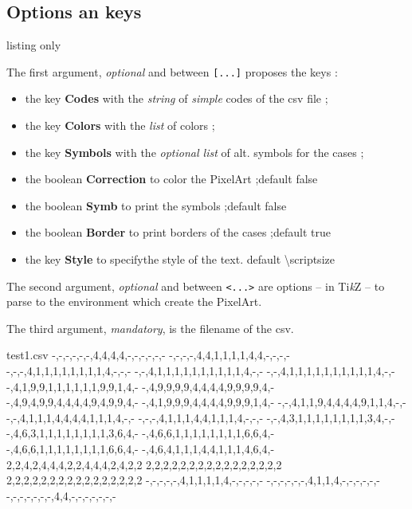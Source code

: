 \documentclass{article}
\newcommand\Cle[1]{{\bfseries\sffamily\textlangle #1\textrangle}}
\begin{document}
\pagebreak

\subsection{Options an keys}

\begin{PresentationCode}{listing only}
\end{PresentationCode}

The first argument, \textit{optional} and between \texttt{[...]} proposes the \textsf{keys} :

\begin{itemize}
	\item the key \Cle{Codes} with the \textit{string} of \textit{simple} codes of the \textsf{csv} file ;
	\item the key \Cle{Colors} with the \textit{list} of colors ;
	\item the key \Cle{Symbols} with the \textit{optional list} of alt. symbols for the cases ;
	\item the boolean \Cle{Correction} to color the PixelArt ;\hfill{}default \textsf{false}
	\item the boolean \Cle{Symb} to print the symbols ;\hfill{}default \textsf{false}
	\item the boolean \Cle{Border} to print borders of the cases ;\hfill{}default \textsf{true}
	\item the key \Cle{Style} to specifythe style of the text. \hfill{}default \textsf{\textbackslash scriptsize}
\end{itemize}

The second argument, \textit{optional} and between \texttt{<...>} are options -- in  Ti\textit{k}Z -- to parse to the environment which create the PixelArt.

\medskip

The third argument, \textit{mandatory}, is the filename of the \textsf{csv}.


\begin{PresentationCode}{}
\begin{filecontents*}[overwrite]{test1.csv}
	-,-,-,-,-,-,4,4,4,4,-,-,-,-,-,-
	-,-,-,-,4,4,1,1,1,1,4,4,-,-,-,-
	-,-,-,4,1,1,1,1,1,1,1,1,4,-,-,-
	-,-,4,1,1,1,1,1,1,1,1,1,1,4,-,-
	-,-,4,1,1,1,1,1,1,1,1,1,1,4,-,-
	-,4,1,9,9,1,1,1,1,1,1,9,9,1,4,-
	-,4,9,9,9,9,4,4,4,4,9,9,9,9,4,-
	-,4,9,4,9,9,4,4,4,4,9,4,9,9,4,-
	-,4,1,9,9,9,4,4,4,4,9,9,9,1,4,-
	-,-,4,1,1,9,4,4,4,4,9,1,1,4,-,-
	-,-,4,1,1,1,4,4,4,4,1,1,1,4,-,-
	-,-,-,4,1,1,1,4,4,1,1,1,4,-,-,-
	-,-,4,3,1,1,1,1,1,1,1,1,3,4,-,-
	-,4,6,3,1,1,1,1,1,1,1,1,3,6,4,-
	-,4,6,6,1,1,1,1,1,1,1,1,6,6,4,-
	-,4,6,6,1,1,1,1,1,1,1,1,6,6,4,-
	-,4,6,4,1,1,1,4,4,1,1,1,4,6,4,-
	2,2,4,2,4,4,4,2,2,4,4,4,2,4,2,2
	2,2,2,2,2,2,2,2,2,2,2,2,2,2,2,2
	2,2,2,2,2,2,2,2,2,2,2,2,2,2,2,2
	-,-,-,-,-,4,1,1,1,1,4,-,-,-,-,-
	-,-,-,-,-,-,4,1,1,4,-,-,-,-,-,-
	-,-,-,-,-,-,-,4,4,-,-,-,-,-,-,-
\end{filecontents*}
\end{PresentationCode}
\end{document}
